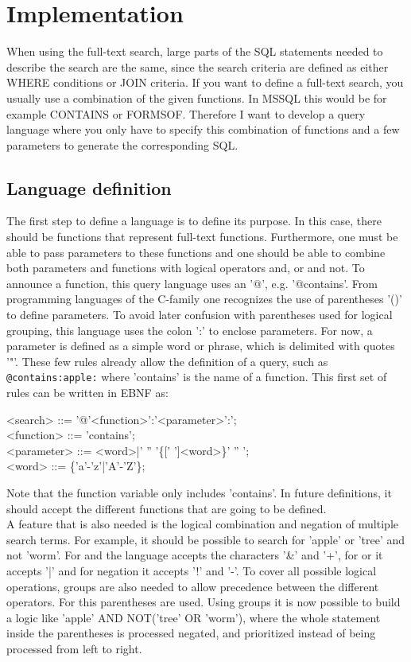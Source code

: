 \newpage
\section{Implementation}
When using the full-text search, large parts of the SQL statements needed to describe the search are the same, since the search criteria are defined as either WHERE conditions or JOIN criteria. If you want to define a full-text search, you usually use a combination of the given functions. In MSSQL this would be for example CONTAINS or FORMSOF. Therefore I want to develop a query language where you only have to specify this combination of functions and a few parameters to generate the corresponding SQL.
\subsection{Language definition}
The first step to define a language is to define its purpose. In this case, there should be functions that represent full-text functions. Furthermore, one must be able to pass parameters to these functions and one should be able to combine both parameters and functions with logical operators and, or and not.
To announce a function, this query language uses an '@', e.g. '@contains'. From programming languages of the C-family one recognizes the use of parentheses '()' to define parameters. To avoid later confusion with parentheses used for logical grouping, this language uses the colon ':' to enclose parameters. For now, a parameter is defined as a simple word or phrase, which is delimited with quotes '"'. These few rules already allow the definition of a query, such as \lstinline[language=Fulltext-Search]$@contains:apple:$ where 'contains' is the name of a function.
This first set of rules can be written in \ac{EBNF} as:
\begin{grammar}
    <search> ::= '@'<function>':'<parameter>':'; \\
    <function> ::= 'contains'; \\
    <parameter> ::= <word>|' '' '\{[' ']<word>\}' '' '; \\
    <word> ::= \{'a'-'z'|'A'-'Z'\};
\end{grammar}
Note that the function variable only includes 'contains'. In future definitions, it should accept the different functions that are going to be defined.\\
A feature that is also needed is the logical combination and negation of multiple search terms. For example, it should be possible to search for 'apple' or 'tree' and not 'worm'. For and the language accepts the characters '\&' and '+', for or it accepts '|' and for negation it accepts '!' and '-'. To cover all possible logical operations, groups are also needed to allow precedence between the different operators. For this parentheses are used. Using groups it is now possible to build a logic like 'apple' AND NOT('tree' OR 'worm'), where the whole statement inside the parentheses is processed negated, and prioritized instead of being processed from left to right.
